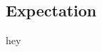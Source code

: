 \documentclass[11pt]{extarticle}
\begin{document}
\begin{flushleft}

\section{Expectation}

hey


\end{flushleft}
\end{document}
